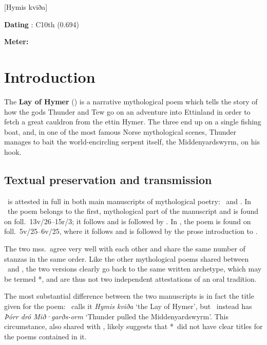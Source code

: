 [Hymis kviða]

\begin{flushright}%
\textbf{Dating} \parencite{Sapp2022}: C10th (0.694)

\textbf{Meter:} \Fornyrdislag%
\end{flushright}%

\section{Introduction}

The \textbf{Lay of Hymer} () is a narrative mythological poem which tells the story of how the gods Thunder and Tew go on an adventure into Ettinland in order to fetch a great cauldron from the ettin Hymer.  The three end up on a single fishing boat, and, in one of the most famous Norse mythological scenes, Thunder manages to bait the world-encircling serpent itself, the Middenyardswyrm, on his hook.

\subsection{Textual preservation and transmission}

\Hymiskvida\ is attested in full in both main manuscripts of mythological poetry: \Regius\ and \AM.  In \Regius\ the poem belongs to the first, mythological part of the manuscript and is found on foll.~13v/26--15r/3; it follows  and is followed by .  In \AM, the poem is found on foll.~5v/25--6v/25, where it follows  and is followed by the prose introduction to .

The two mss.~agree very well with each other and share the same number of stanzas in the same order.  Like the other mythological poems shared between \Regius\ and \AM, the two versions clearly go back to the same written archetype, which may be termed *\Regius\AM, and are thus not two independent attestations of an oral tradition.

The most substantial difference between the two manuscripts is in fact the title given for the poem: \AM\ calls it \emph{Hymis kviða} ‘the Lay of Hymer’, but \Regius\ instead has \emph{Þórr dró Mið·garðs-orm} ‘Thunder pulled the Middenyardswyrm’.  This circumstance, also shared with , likely suggests that *\Regius\AM\ did not have clear titles for the poems contained in it.


